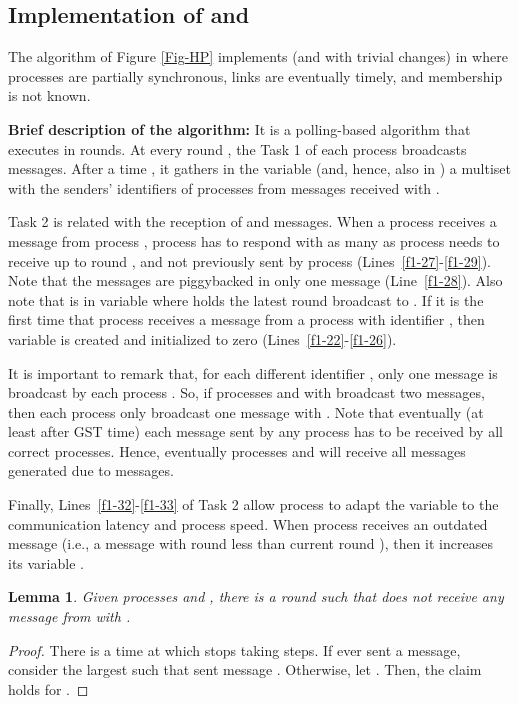 \documentclass[10pt, conference, compsocconf]{IEEEtran}
\newtheorem{lemma}{Lemma}
\newcommand{\tightparagraph}[1]{\smallskip \noindent \textbf{#1} \hspace{1ex}}
\begin{document}
\subsection{Implementation of  and }
The algorithm of Figure \ref{Fig-HP} implements  (and  
with trivial changes) in  where processes 
are partially synchronous, links are eventually timely, and membership 
is not known. 

\tightparagraph{Brief description of the algorithm:} 
It is a polling-based algorithm that executes in rounds. 
At every round , the Task 1 of each process  broadcasts 
 messages. After a time , 
it gathers in the variable  (and, hence, also in ) 
a multiset with the senders' identifiers  of processes from 
 messages received with .

Task 2 is related with the reception of  and  
messages. When a process  receives a  message from 
process , process  has to respond with as many  
as process  needs to receive up to round , and not 
previously sent by process  (Lines~\ref{f1-27}-\ref{f1-29}). 
Note that the  
messages are piggybacked in only one message (Line~\ref{f1-28}). 
Also note that is in variable  where  holds the 
latest round broadcast to . 
If it is the first time that process  receives a  
message from a process with identifier 
, then variable  is created and initialized to 
zero (Lines~\ref{f1-22}-\ref{f1-26}).

It is important to remark that, for each different identifier , 
only one  
message is broadcast by each process . So, if processes  and 
 with  broadcast two  messages, 
then each process  only broadcast one  
message with  . Note that eventually (at least after 
GST time) each   
message sent by any process has to be received by all correct processes. 
Hence, eventually processes  and  
will receive all   messages generated due to  messages.

Finally, Lines~\ref{f1-32}-\ref{f1-33} of Task 2 allow process  
to adapt the variable 
 to the communication latency and process speed. 
When process  receives an outdated  
message (i.e., a message with round  less than current round ), 
then it increases its variable .


\begin{lemma}
\label{l-faulty}
Given processes  and , there is a round  
such that  does not receive any 
 message from 
 with .
\end{lemma}
\begin{proof}
There is a time  at which  stops taking steps. If  ever 
sent a  message, 
consider the largest 
such that  sent message . 
Otherwise, let . Then, the claim holds for .
\end{proof}
\end{document}
